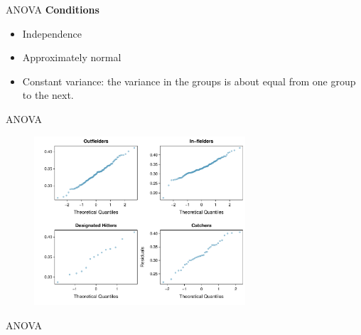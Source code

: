 \documentclass[12pt,a4paper]{beamer}
\begin{document}
\begin{frame}{ANOVA}
	\textbf{Conditions}
	\begin{itemize}
		\item Independence
		\item Approximately normal
		\item Constant variance: the variance in the groups is about equal from one group to the next.
	\end{itemize}
		
\end{frame}
\begin{frame}{ANOVA}
	\begin{figure}[hhh]
	\centering
	\includegraphics[width=0.7\textwidth]{figures/mlbANOVA/mlbANOVADiagNormalityGroups}
	\end{figure}
\end{frame}
\begin{frame}{ANOVA}
	\begin{table}[ht]
	\centering
	\end{table}
\end{frame}
\end{document}
